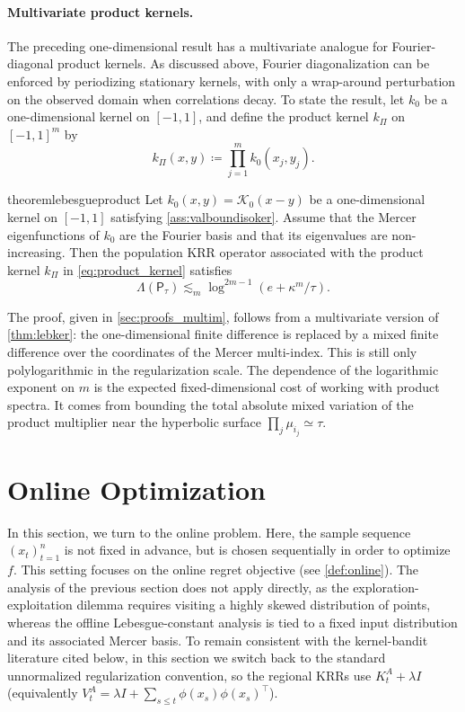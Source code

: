 \documentclass{article}
\numberwithin{theorem}{section}
\theoremstyle{definition}
\begin{document}
\paragraph{Multivariate product kernels.}
The preceding one-dimensional result has a multivariate analogue for Fourier-diagonal product kernels. As discussed above, Fourier diagonalization can be enforced by periodizing stationary kernels, with only a wrap-around perturbation on the observed domain when correlations decay. 
To state the result, let $k_0$ be a one-dimensional kernel on $[-1,1]$, and define the product kernel $k_\Pi$ on $[-1,1]^m$ by
\begin{equation}
k_\Pi(x,y)\coloneqq \prod_{j=1}^m k_0(x_j,y_j).\label{eq:product_kernel}
\end{equation}
\begin{restatable}{theorem}{lebesgueproduct}\label{thm:lebesgueproduct}
    Let $k_0(x,y)=\mathscr K_0(x-y)$ be a one-dimensional kernel on $[-1,1]$ satisfying  \cref{ass:valboundisoker}. Assume that the Mercer eigenfunctions of $k_0$ are the Fourier basis and that its eigenvalues are non-increasing. Then the population KRR operator associated with the product kernel $k_\Pi$ in \eqref{eq:product_kernel} satisfies
    $$\Lambda(\mathsf{P}_{\tau})\lesssim_m \log^{2m-1}(e+\kappa^m/\tau).$$
\end{restatable}
The proof, given in \cref{sec:proofs_multim}, follows from a multivariate version of \cref{thm:lebker}: the one-dimensional finite difference is replaced by a mixed finite difference over the coordinates of the Mercer multi-index.
This is still only polylogarithmic in the regularization scale. The dependence of the logarithmic exponent on $m$ is the expected fixed-dimensional cost of working with product spectra. It comes from bounding the total absolute mixed variation of the product multiplier near the hyperbolic surface $\prod_j\mu_{i_j}\simeq\tau$.


\section{Online Optimization}\label{sec:online}

In this section, we turn to the online problem. Here, the sample sequence $(x_t)_{t=1}^n$ is not fixed in advance, but is chosen sequentially in order to optimize $f$. This setting focuses on the online regret objective (see \cref{def:online}). The analysis of the previous section does not apply directly, as the exploration-exploitation dilemma requires visiting a highly skewed distribution of points, whereas the offline Lebesgue-constant analysis is tied to a fixed input distribution and its associated Mercer basis.
To remain consistent with the kernel-bandit literature cited below, in this section we switch back to the standard unnormalized regularization convention, so the regional KRRs use $K_t^A+\lambda I$ (equivalently $V_t^A=\lambda I+\sum_{s\le t}\phi(x_s)\phi(x_s)^\top$).
\end{document}
